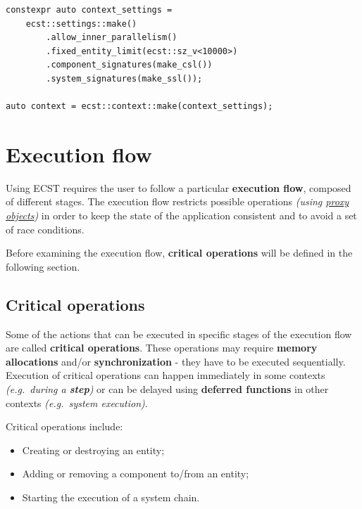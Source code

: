 \documentclass[twoside, 12pt, a4paper, openany]{book}
\begin{document}
\begin{verbatim}
constexpr auto context_settings =
    ecst::settings::make()
        .allow_inner_parallelism()
        .fixed_entity_limit(ecst::sz_v<10000>)
        .component_signatures(make_csl())
        .system_signatures(make_ssl());

auto context = ecst::context::make(context_settings);
\end{verbatim}

\hypertarget{chap_flow}{\chapter{Execution flow}\label{chap_flow}}

Using ECST requires the user to follow a particular \textbf{execution
flow}, composed of different stages. The execution flow restricts
possible operations \emph{(using \protect\hyperlink{chap_proxies}{proxy
objects})} in order to keep the state of the application consistent and
to avoid a set of race conditions.

Before examining the execution flow, \textbf{critical operations} will
be defined in the following section.

\section{Critical operations}\label{critical-operations}

Some of the actions that can be executed in specific stages of the
execution flow are called \textbf{critical operations}. These operations
may require \textbf{memory allocations} and/or \textbf{synchronization}
- they have to be executed sequentially. Execution of critical
operations can happen immediately in some contexts \emph{(e.g.~during a
\textbf{step})} or can be delayed using \textbf{deferred functions} in
other contexts \emph{(e.g.~system execution)}.

Critical operations include:

\begin{itemize}
\item
  Creating or destroying an entity;
\item
  Adding or removing a component to/from an entity;
\item
  Starting the execution of a system chain.
\end{itemize}
\end{document}
